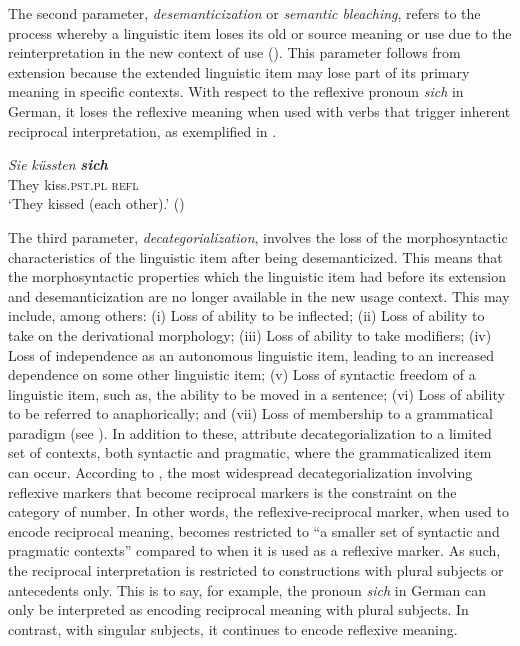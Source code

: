 \documentclass[output=paper,
            colorlinks, citecolor=brown
            ,draftmode
		  ]{langscibook}
\begin{document}
The second parameter, \textit{desemanticization} or \textit{semantic bleaching}, refers to the process whereby a linguistic item loses its old or source meaning or use due to the reinterpretation in the new context of use  (\citealt{HeineDunham2010, HeineNarrog2009}). This parameter follows from extension because the extended linguistic item may lose part of its primary meaning in specific contexts. With respect to the reflexive pronoun \textit{sich} in German, it loses the reflexive meaning when used with verbs that trigger inherent reciprocal interpretation, as exemplified in . 

\ea\label{ex:ngwasi:21}
\gll \textit{Sie}  \textit{küssten} \textbf{\textit{sich}}\\
They  kiss.\textsc{pst.pl}  \textsc{refl}\\
\glt ‘They kissed (each other).’         (\citealt[410]{HeineNarrog2009})
\z


The third parameter, \textit{decategorialization}, involves the loss of the morphosyntactic characteristics of the linguistic item after being desemanticized. This means that the morphosyntactic properties which the linguistic item had before its extension and desemanticization are no longer available in the new usage context. This may include, among others: (i) Loss of ability to be inflected;  (ii) Loss of ability to take on the derivational morphology; (iii) Loss of ability to take modifiers; (iv) Loss of independence as an autonomous linguistic item, leading to an increased dependence on some other linguistic item; (v) Loss of syntactic freedom of a linguistic item, such as, the ability to be moved in a sentence; (vi) Loss of ability to be referred to anaphorically; and (vii) Loss of membership to a grammatical paradigm (see \citealt{Heine2003, HeineDunham2010}). In addition to these, \citet{HeineMiyashita2008} attribute decategorialization to a limited set of contexts, both syntactic and pragmatic, where the grammaticalized item can occur. According to \citet[196--197]{HeineMiyashita2008}, the most widespread decategorialization involving reflexive markers that become reciprocal markers is the constraint on the category of number. In other words, the reflexive-reciprocal marker, when used to encode reciprocal meaning, becomes restricted to “a smaller set of syntactic and pragmatic contexts” compared to when it is used as a reflexive marker. As such, the reciprocal interpretation is restricted to constructions with plural subjects or antecedents only. This is to say, for example, the pronoun \textit{sich} in German can only be interpreted as encoding reciprocal meaning with plural subjects. In contrast, with singular subjects, it continues to encode reflexive meaning.
\end{document}
